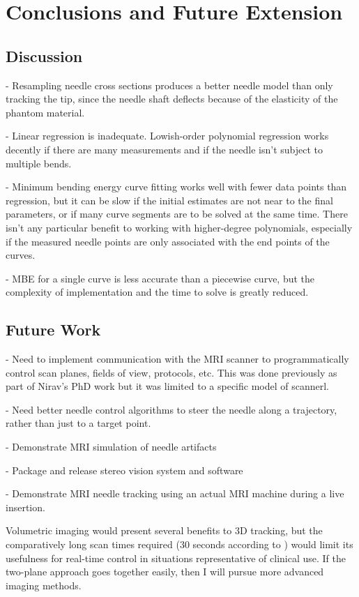 \chapter{Conclusions and Future Extension}
\label{conclusions} %


\section{Discussion}
- Resampling needle cross sections produces a better needle model than only tracking the tip, since the needle shaft deflects because of the elasticity of the phantom material.

- Linear regression is inadequate. Lowish-order polynomial regression works decently if there are many measurements and if the needle isn't subject to multiple bends.

- Minimum bending energy curve fitting works well with fewer data points than regression, but it can be slow if the initial estimates are not near to the final parameters, or if many curve segments are to be solved at the same time. There isn't any particular benefit to working with higher-degree polynomials, especially if the measured needle points are only associated with the end points of the curves.

- MBE for a single curve is less accurate than a piecewise curve, but the complexity of implementation and the time to solve is greatly reduced.

\section{Future Work}
- Need to implement communication with the MRI scanner to programmatically control scan planes, fields of view, protocols, etc. This was done previously as part of Nirav's PhD work but it was limited to a specific model of scannerl.

- Need better needle control algorithms to steer the needle along a trajectory, rather than just to a target point. 

- Demonstrate MRI simulation of needle artifacts

- Package and release stereo vision system and software

- Demonstrate MRI needle tracking using an actual MRI machine during a live insertion.

Volumetric imaging would present several benefits to 3D tracking, but the comparatively long scan times required (30 seconds according to \cite{BiopsyReview}) would limit its usefulness for real-time control in situations representative of clinical use. If the two-plane approach goes together easily, then I will pursue more advanced imaging methods.

